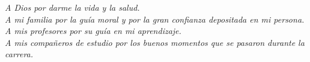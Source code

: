\vspace*{4cm}
{
\raggedleft
\textit{A Dios por darme la vida y la salud.\\
A mi familia por la guía moral y por la gran confianza depositada en mi persona.\\
A mis profesores por su guía en mi aprendizaje.\\
A mis compañeros de estudio por los buenos momentos que se pasaron durante la carrera.\\}
}
